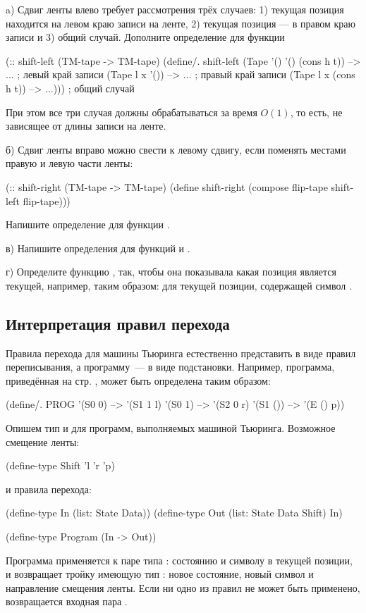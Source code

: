 \begin{Assignment}
a) Сдвиг ленты влево требует рассмотрения трёх случаев: 1) текущая позиция находится на левом краю записи на ленте, 2) текущая позиция --- в правом краю записи и 3) общий случай.
 Дополните определение для функции 
\begin{Definition}
(:: shift-left (TM-tape -> TM-tape)
  (define/. shift-left
    (Tape '() '() (cons h t)) --> ...   ; левый край записи
    (Tape  l x '())           --> ...   ; правый край записи
    (Tape  l x (cons h t))    --> ...))) ; общий случай
\end{Definition}
\noindent

При этом все три случая должны обрабатываться за время $O(1)$, то  есть, не зависящее от длины записи на ленте.

б) Сдвиг ленты вправо можно свести к левому сдвигу, если поменять местами правую и левую части ленты:
\begin{Definition}
(:: shift-right (TM-tape -> TM-tape)
  (define shift-right
    (compose flip-tape shift-left flip-tape)))
\end{Definition}
Напишите определение для функции .

в) Напишите определения для функций  и .

г) Определите функцию , так, чтобы она показывала какая позиция является текущей, например, таким образом:  для текущей позиции, содержащей символ .
\end{Assignment}

\subsection*{Интерпретация правил перехода}

Правила перехода для машины Тьюринга естественно представить в виде правил переписывания, а программу~--- в виде подстановки. Например, программа, приведённая на стр. \pageref{TM-prog}, может быть определена таким образом:
\begin{SchemeCode}
(define/. PROG
  '(S0 0) --> '(S1 1 l)
  '(S0 1) --> '(S2 0 r)
  '(S1 ()) --> '(E () p))
\end{SchemeCode}

Опишем тип и для программ, выполняемых машиной Тьюринга. Возможное смещение ленты:
\begin{SchemeCode}
(define-type Shift  'l 'r 'p)
\end{SchemeCode}
\noindent и правила перехода:
\begin{SchemeCode}
(define-type In  (list: State Data))
(define-type Out 
 (list: State Data Shift) 
 In)

(define-type Program (In -> Out))
\end{SchemeCode}
Программа применяется к паре типа : состоянию и символу в текущей позиции, и возвращает тройку имеющую тип : новое состояние, новый символ и направление смещения ленты. Если ни одно из правил не может быть применено, возвращается входная пара .

